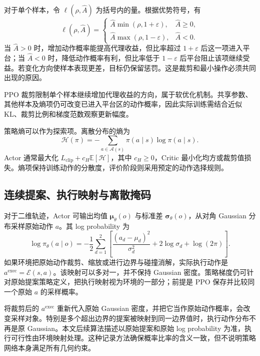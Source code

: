 对于单个样本，令 $\ell(\rho,\widehat A)$ 为括号内的量。根据优势符号，有
\begin{equation}
    \ell(\rho,\widehat A)=
    \begin{cases}
       \widehat A\min(\rho,1+\varepsilon),&\widehat A\geq0,\\
       \widehat A\max(\rho,1-\varepsilon),&\widehat A<0.
    \end{cases}
    \label{eq:ch2-ppo-piecewise}
\end{equation}
当 $\widehat A>0$ 时，增加动作概率能提高代理收益，但比率超过 $1+\varepsilon$ 后这一项进入平台；当 $\widehat A<0$ 时，降低动作概率有利，但比率低于 $1-\varepsilon$ 后平台阻止该项继续受益。若变化方向使样本表现更差，目标仍保留惩罚。这是裁剪和最小操作必须共同出现的原因。

PPO 裁剪限制单个样本继续增加代理收益的方向，属于软优化机制。共享参数、其他样本及熵项仍可改变已进入平台区的动作概率，因此实际训练需结合近似 KL、裁剪比例和梯度范数观察更新幅度。

策略熵可以作为探索项。离散分布的熵为
\begin{equation}
    \mathcal H(\pi)=-\sum_{a\in\mathcal A(s)}\pi(a\mid s)\log\pi(a\mid s).
    \label{eq:ch2-entropy}
\end{equation}
Actor 通常最大化 $L_{\mathrm{clip}}+c_H\mathbb E[\mathcal H]$，其中 $c_H\geq0$，Critic 最小化均方或裁剪值损失。熵项保持训练动作的分散度，评价阶段则采用预定的动作选择规则。

\subsection{连续提案、执行映射与离散掩码}
\label{sec:ch2-action-consistency}

对于二维轨迹，Actor 可输出均值 $\boldsymbol\mu_\theta(o)$ 与标准差 $\boldsymbol\sigma_\theta(o)$，从对角 Gaussian 分布采样原始动作 $a$。其 log probability 为
\begin{equation}
    \log\pi_\theta(a\mid o)
    =-\frac{1}{2}\sum_{d=1}^{2}\left[
        \frac{(a_d-\mu_d)^2}{\sigma_d^2}+2\log\sigma_d+\log(2\pi)\right].
    \label{eq:ch2-gaussian-logprob}
\end{equation}
如果环境把原始动作裁剪、缩放或进行边界与碰撞消解，实际执行动作是 $a^{\mathrm{exec}}=\mathcal E(s,a)$。该映射可以多对一，并不保持 Gaussian 密度。策略梯度仍可针对原始提案策略定义，把执行映射视为环境的一部分；前提是 PPO 保存并比较同一个原始 $a$ 的采样概率。

将裁剪后的 $a^{\mathrm{exec}}$ 重新代入原始 Gaussian 密度，并把它当作原始动作概率，会改变采样对象。特别是多个超出边界的提案被映射到同一边界值时，执行动作分布不再是原 Gaussian。本文后续算法描述以原始提案和原始 log probability 为准，执行可行性由环境映射处理。这种记录方法确保概率比率的含义一致，但不说明策略网络本身满足所有几何约束。

